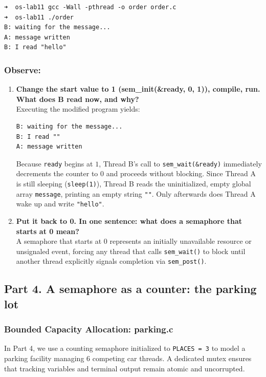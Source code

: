 \documentclass{labreport}
\begin{document}
\begin{lstlisting}[style=bash]
➜  os-lab11 gcc -Wall -pthread -o order order.c
➜  os-lab11 ./order
B: waiting for the message...
A: message written
B: I read "hello"
\end{lstlisting}

\subsubsection*{Observe:}
\begin{enumerate}[leftmargin=*]
    \item \textbf{Change the start value to 1 (sem\_init(\&ready, 0, 1)), compile, run. What does B read now, and why?}\\[0.2em]
    Executing the modified program yields:
    \begin{lstlisting}[style=bash]
B: waiting for the message...
B: I read ""
A: message written
    \end{lstlisting}
    Because \texttt{ready} begins at $1$, Thread B's call to \texttt{sem\_wait(\&ready)} immediately decrements the counter to $0$ and proceeds without blocking. Since Thread A is still sleeping (\texttt{sleep(1)}), Thread B reads the uninitialized, empty global array \texttt{message}, printing an empty string \texttt{""}. Only afterwards does Thread A wake up and write \texttt{"hello"}.

    \item \textbf{Put it back to 0. In one sentence: what does a semaphore that starts at 0 mean?}\\[0.2em]
    A semaphore that starts at $0$ represents an initially unavailable resource or unsignaled event, forcing any thread that calls \texttt{sem\_wait()} to block until another thread explicitly signals completion via \texttt{sem\_post()}.
\end{enumerate}

\subsection{Part 4. A semaphore as a counter: the parking lot}

\subsubsection{Bounded Capacity Allocation: parking.c}
In Part 4, we use a counting semaphore initialized to \texttt{PLACES = 3} to model a parking facility managing 6 competing car threads. A dedicated mutex ensures that tracking variables and terminal output remain atomic and uncorrupted.
\end{document}
